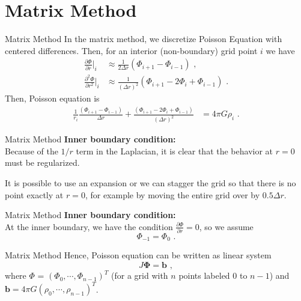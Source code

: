 \documentclass[11pt]{beamer}
\begin{document}
\section{Matrix Method}
\begin{frame}[fragile]{Matrix Method}
In the matrix method, we discretize Poisson Equation
with centered differences. Then, for an interior (non-boundary) grid point $i$ we have
\begin{equation}
\begin{aligned}
\frac{\partial \Phi }{\partial r} \bigg|_i &\approx \frac{1}{2\Delta r} \left(\Phi_{i+1} - \Phi_{i-1}\right)\,\,,\\
\frac{\partial^2 \Phi }{\partial r^2}  \bigg|_i &\approx \frac{1}{(\Delta r)^2} \left(\Phi_{i+1} - 2 \Phi_i + \Phi_{i-1} \right)\,\,.
\end{aligned}
\end{equation}
Then, Poisson equation is
\begin{equation}
\begin{aligned}
\frac{1}{r_i} \frac{\left(\Phi_{i+1} - \Phi_{i-1}\right)}{\Delta r}  + \frac{\left(\Phi_{i+1} - 2 \Phi_i + \Phi_{i-1} \right)}{(\Delta r)^2}  &= 4\pi G \rho_i\,\,.
\end{aligned}
\end{equation}
\end{frame}

\begin{frame}[fragile]{Matrix Method}
\textbf{Inner boundary condition:}\\
Because of the $1/r$ term in the Laplacian, it is clear that the behavior 
 at $r=0$ must be regularized. \\
 \bigskip
 
 It is possible to use an expansion or we can
stagger the grid so that there is no point exactly at $r=0$, for example 
by moving the entire grid over by $0.5 \Delta r$.  \\
\end{frame}

\begin{frame}[fragile]{Matrix Method}
\textbf{Inner boundary condition:}\\
At the inner boundary, we have the condition $\frac{\partial \Phi}{ \partial r} = 0$, so we assume
\begin{equation}
\Phi_{-1} = \Phi_{0}\,\,.
\end{equation}
\end{frame}

\begin{frame}[fragile]{Matrix Method}
Hence, Poisson equation can be written as linear system
\begin{equation}
J \mathbf{\Phi} = \mathbf{b}\,\,,
\label{eq:pde_poisson2}
\end{equation}
where $\Phi$ = $(\Phi_0, \cdots , \Phi_{n-1})^T$ (for a grid with $n$
points labeled $0$ to $n-1$) and  $\mathbf{b} = 4\pi G
(\rho_0, \cdots , \rho_{n-1})^T$. 
\end{frame}
\end{document}
